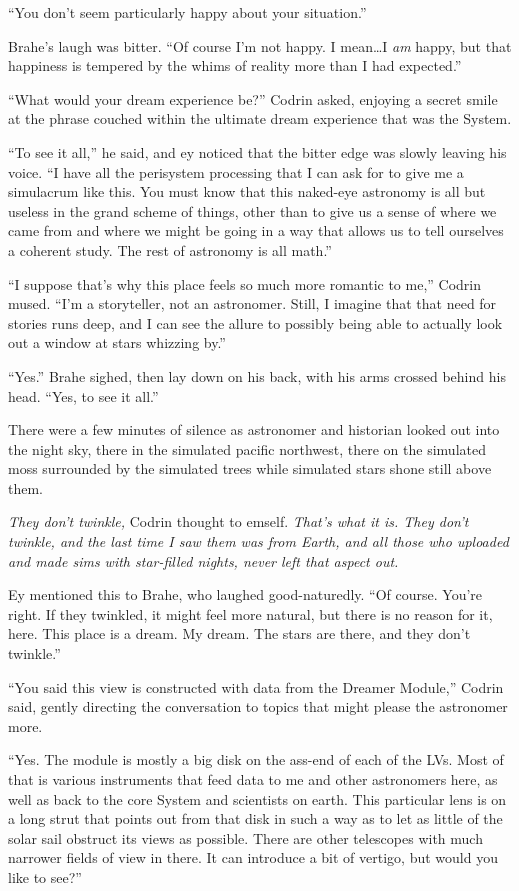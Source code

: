 ``You don't seem particularly happy about your situation.''

Brahe's laugh was bitter. ``Of course I'm not happy. I mean\ldots I \emph{am} happy, but that happiness is tempered by the whims of reality more than I had expected.''

``What would your dream experience be?'' Codrin asked, enjoying a secret smile at the phrase couched within the ultimate dream experience that was the System.

``To see it all,'' he said, and ey noticed that the bitter edge was slowly leaving his voice. ``I have all the perisystem processing that I can ask for to give me a simulacrum like this. You must know that this naked-eye astronomy is all but useless in the grand scheme of things, other than to give us a sense of where we came from and where we might be going in a way that allows us to tell ourselves a coherent study. The rest of astronomy is all math.''

``I suppose that's why this place feels so much more romantic to me,'' Codrin mused. ``I'm a storyteller, not an astronomer. Still, I imagine that that need for stories runs deep, and I can see the allure to possibly being able to actually look out a window at stars whizzing by.''

``Yes.'' Brahe sighed, then lay down on his back, with his arms crossed behind his head. ``Yes, to see it all.''

There were a few minutes of silence as astronomer and historian looked out into the night sky, there in the simulated pacific northwest, there on the simulated moss surrounded by the simulated trees while simulated stars shone still above them.

\emph{They don't twinkle,} Codrin thought to emself. \emph{That's what it is. They don't twinkle, and the last time I saw them was from Earth, and all those who uploaded and made sims with star-filled nights, never left that aspect out.}

Ey mentioned this to Brahe, who laughed good-naturedly. ``Of course. You're right. If they twinkled, it might feel more natural, but there is no reason for it, here. This place is a dream. My dream. The stars are there, and they don't twinkle.''

``You said this view is constructed with data from the Dreamer Module,'' Codrin said, gently directing the conversation to topics that might please the astronomer more.

``Yes. The module is mostly a big disk on the ass-end of each of the LVs. Most of that is various instruments that feed data to me and other astronomers here, as well as back to the core System and scientists on earth. This particular lens is on a long strut that points out from that disk in such a way as to let as little of the solar sail obstruct its views as possible. There are other telescopes with much narrower fields of view in there. It can introduce a bit of vertigo, but would you like to see?''

